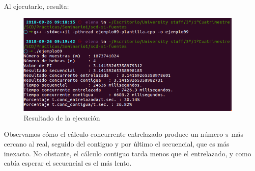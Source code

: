 \documentclass[12pt]{article}
\begin{document}
Al ejecutarlo, resulta: 
\begin{figure}[h]
	\centering
	\includegraphics[scale=0.5]{../images/1.png}
	\caption{Resultado de la ejecución}
\end{figure}

Observamos cómo el cálculo concurrente entrelazado produce un número $\pi$ más cercano al real, seguido del contiguo y por último el secuencial, que es más inexacto. No obstante, el cálculo contiguo tarda menos que el entrelazado, y como cabía esperar el secuencial es el más lento.
\end{document}
